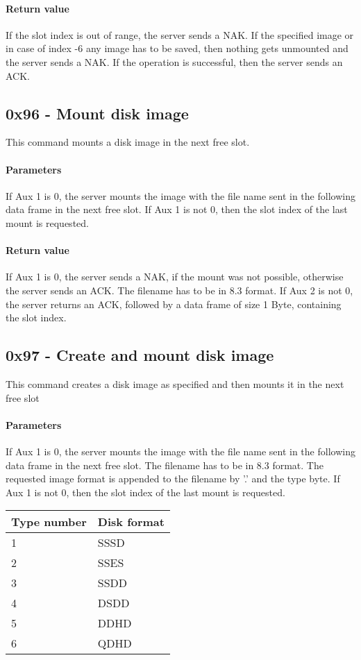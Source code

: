 \documentclass[10pt]{article}
\begin{document}
\paragraph{Return value}
If the slot index is out of range, the server sends a NAK.
If the specified image or in case of index -6 any image has to be saved, then nothing gets unmounted and the server sends a NAK.
If the operation is successful, then the server sends an ACK.

\subsection{0x96 - Mount disk image}
This command mounts a disk image in the next free slot.

\paragraph{Parameters}
If Aux 1 is 0, the server mounts the image with the file name sent in the following data frame in the next free slot.
If Aux 1 is not 0, then the slot index of the last mount is requested. 

\paragraph{Return value}
If Aux 1 is 0, the server sends a NAK, if the mount was not possible, otherwise the server sends an ACK. The filename has to be in 8.3 format.
If Aux 2 is not 0, the server returns an ACK, followed by a data frame of size 1 Byte, containing the slot index.

\subsection{0x97 - Create and mount disk image}
This command creates a disk image as specified and then mounts it in the next free slot

\paragraph{Parameters}
If Aux 1 is 0, the server mounts the image with the file name sent in the following data frame in the next free slot. The filename has to be in 8.3 format. The requested image format is appended to the filename by '.' and the type byte.
If Aux 1 is not 0, then the slot index of the last mount is requested.\\

\begin{tabular}{ll}
Type number & Disk format \\ \hline
1 & SSSD \\
2 & SSES \\
3 & SSDD \\
4 & DSDD \\
5 & DDHD \\
6 & QDHD
\end{tabular}
\end{document}
